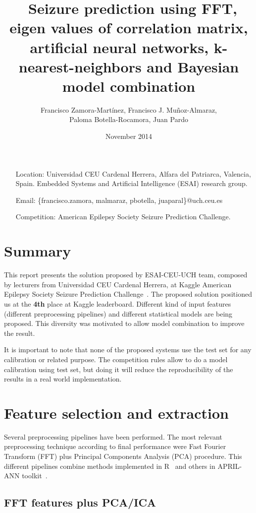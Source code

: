 \documentclass[a4paper,english,twoside]{article}
\author{Francisco Zamora-Martínez, Francisco J. Muñoz-Almaraz,\\
  Paloma Botella-Rocamora, Juan Pardo}
\date{November 2014}
\title{\ Seizure prediction using FFT, eigen values of correlation matrix,
  artificial neural networks, k-nearest-neighbors and Bayesian model combination}
\begin{document}
\maketitle

\begin{itemize}
\item[Location:] Universidad CEU Cardenal Herrera, Alfara del Patriarca,
  Valencia, Spain. Embedded Systems and Artificial Intelligence (ESAI) research
  group.
\item[Email:] \{francisco.zamora, malmaraz, pbotella, juaparal\}@uch.ceu.es
\item[Competition:] American Epilepsy Society Seizure Prediction Challenge.
\end{itemize}

\section{Summary}\label{summary}

This report presents the solution proposed by ESAI-CEU-UCH team, composed by
lecturers from Universidad CEU Cardenal Herrera, at Kaggle American Epilepsy
Society Seizure Prediction Challenge~\cite{kaggle}. The proposed solution
positioned us at the \textbf{4th} place at Kaggle leaderboard. Different kind of
input features (different preprocessing pipelines) and different statistical
models are being proposed. This diversity was motivated to allow model
combination to improve the result.

It is important to note that none of the proposed systems use the test set
for any calibration or related purpose. The competition rules allow to do a
model calibration using test set, but doing it will reduce the
reproducibility of the results in a real world implementation.

\section{Feature selection and
  extraction}\label{feature-selection-and-extraction}

Several preprocessing pipelines have been performed. The most relevant
preprocessing technique according to final performance were Fast Fourier
Transform (FFT) plus Principal Components Analysis (PCA) procedure. This
different pipelines combine methods implemented in R~\cite{Rproject} and others
in APRIL-ANN toolkit~\cite{aprilann}.

\subsection{FFT features plus PCA/ICA}\label{fft-features-plus-pcaica}
\end{document}
